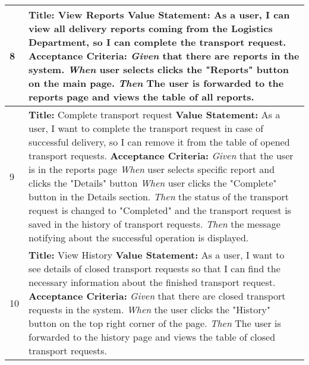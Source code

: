 \documentclass[a4paper]{article}
\begin{document}
\begin{longtable}[c]{|p{0.5cm}||p{}|}
             8 & 
                 \textbf{Title:} View Reports   \newline
                 \textbf{Value Statement:} As a user, I can view all delivery reports coming from the Logistics Department, so I can complete the transport request. \newline
                \textbf{Acceptance Criteria:} \newline
                 \emph{Given} that there are reports in the system.\newline 
                 \emph{When} user selects clicks the "Reports" button on the main page.\newline
                 \emph{Then} The user is forwarded to the reports page and views the table of all reports.
             \\
             \hline
             9 & 
                 \textbf{Title:}  Complete transport request   \newline
                 \textbf{Value Statement:}  As a user, I want to complete the transport request in case of successful delivery, so I can remove it from the table of opened transport requests. \newline
                 \textbf{Acceptance Criteria:} \newline
                 \emph{Given} that the user is in the reports page\newline 
                 \emph{When} user selects specific report and clicks the "Details" button\newline
                 \emph{When} user clicks the "Complete" button in the Details section.\newline
                 \emph{Then} the status of the transport request is changed to "Completed" and the transport request is saved in the history of transport requests. \newline
                 \emph{Then} the message notifying about the successful operation is displayed.                          \\
             \hline
             10 & 
                 \textbf{Title:} View History   \newline
                 \textbf{Value Statement:}  As a user, I want to see details of closed transport requests so that I can find the necessary information about the finished transport request. \newline
                \textbf{Acceptance Criteria:} \newline
                 \emph{Given} that there are closed transport requests in the system.\newline 
                 \emph{When} the user clicks the "History" button on the top right corner of the page.\newline
                 \emph{Then} The user is forwarded to the history page and views the table of closed transport requests.
                \\
                \hline
           
    
        \end{longtable}
  
\end{document}
